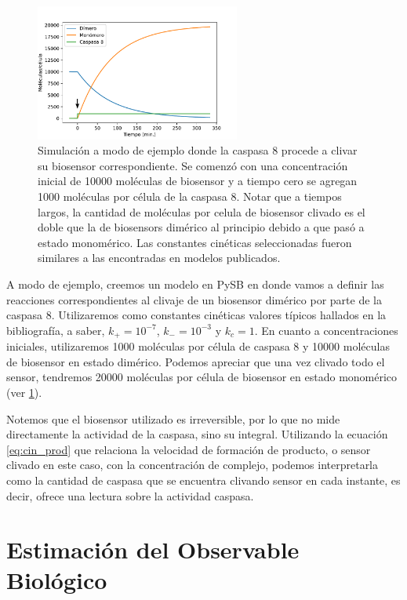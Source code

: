 \begin{figure}[b!]
    \centering
    \includegraphics[width=0.6\textwidth]{img/cap_2/ejemplo_enzima.pdf}
    \caption{\footnotesize{Simulación a modo de ejemplo donde la caspasa 8 procede a clivar su biosensor correspondiente. Se comenzó con una concentración inicial de 10000 moléculas de biosensor y a tiempo cero se agregan 1000 moléculas por célula de la caspasa 8. Notar que a tiempos largos, la cantidad de moléculas por celula de biosensor clivado es el doble que la de biosensors dimérico al principio debido a que pasó a estado monomérico. Las constantes cinéticas seleccionadas fueron similares a las encontradas en modelos publicados.}}
    \label{fig:ejemplo_enzima}
\end{figure}

A modo de ejemplo, creemos un modelo en PySB \citep{Lopez2013} en donde vamos a definir las reacciones correspondientes al clivaje de un biosensor dimérico por parte de la caspasa 8. Utilizaremos como constantes cinéticas valores típicos hallados en la bibliografía, a saber, $k_+ = 10^{-7}$, $k_- = 10^{-3}$ y $k_c = 1$. En cuanto a concentraciones iniciales, utilizaremos 1000 moléculas por célula de caspasa 8 y 10000 moléculas de biosensor en estado dimérico. Podemos apreciar que una vez clivado todo el sensor, tendremos 20000 moléculas por célula de biosensor en estado monomérico (ver \cref{fig:ejemplo_enzima}).

Notemos que el biosensor utilizado es irreversible, por lo que no mide directamente la actividad de la caspasa, sino su integral. Utilizando la ecuación \ref{eq:cin_prod} que relaciona la velocidad de formación de producto, o sensor clivado en este caso, con la concentración de complejo, podemos interpretarla como la cantidad de caspasa que se encuentra clivando sensor en cada instante, es decir, ofrece una lectura sobre la actividad caspasa.


\section{Estimación del Observable Biológico}
\label{sec:Observable}


